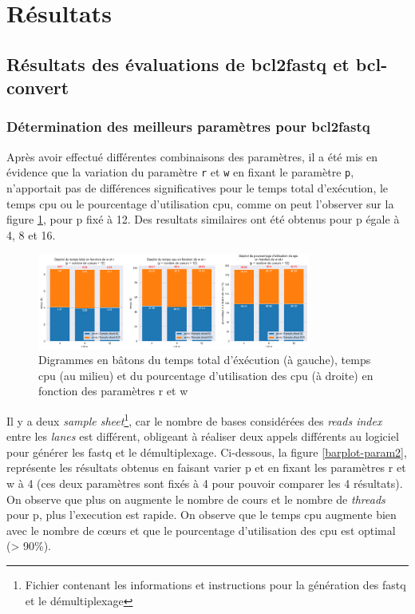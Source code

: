 \section{Résultats}
\subsection{Résultats des évaluations de bcl2fastq et bcl-convert}
\subsubsection{Détermination des meilleurs paramètres pour bcl2fastq}
Après avoir effectué différentes combinaisons des paramètres, il a été mis en évidence que la variation du paramètre \texttt{r} et \texttt{w} en fixant le paramètre \texttt{p}, n'apportait pas de différences significatives pour le temps total d'exécution, le temps cpu ou le pourcentage d'utilisation cpu, comme on peut l'observer sur la figure \ref{barplot-param}, pour p fixé à 12. Des resultats similaires ont été obtenus pour p égale à 4, 8 et 16. 

\begin{figure}[H]
    \centering
    \includegraphics[width=0.8\textwidth]{img/barplot_cum_jarvis2.png}
    \caption{\footnotesize{Digrammes en bâtons du temps total d'éxécution (à gauche), temps cpu (au milieu) et du pourcentage d'utilisation des cpu (à droite) en fonction des paramètres r et w}}
    \label{barplot-param}
\end{figure}

Il y a deux \emph{sample sheet}\footnote{Fichier contenant les informations et instructions pour la génération des fastq et le démultiplexage}, car le nombre de bases considérées des \emph{reads index} entre les \emph{lanes} est différent, obligeant à réaliser deux appels différents au logiciel pour générer les fastq et le démultiplexage. Ci-dessous, la figure \ref{barplot-param2}, représente les résultats obtenus en faisant varier p et en fixant les paramètres r et w à 4 (ces deux paramètres sont fixés à 4 pour pouvoir comparer les 4 résultats). On observe que plus on augmente le nombre de cours et le nombre de \emph{threads} pour p, plus l'execution est rapide. On observe que le temps cpu augmente bien avec le nombre de cœurs et que le pourcentage d'utilisation des cpu est optimal (> 90\%).

